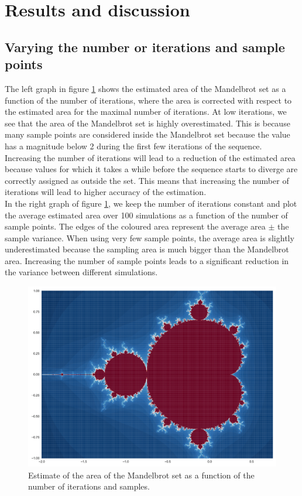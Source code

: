 \documentclass{uva-inf-article}
\begin{document}
\section{Results and discussion}
\subsection{Varying the number or iterations and sample points}

The left graph in figure \ref{fig:var_i_s} shows the estimated area of the Mandelbrot set as a function of the number of iterations, where the area is corrected with respect to the estimated area for the maximal number of iterations.
At low iterations, we see that the area of the Mandelbrot set is highly overestimated.
This is because many sample points are considered inside the Mandelbrot set because the value has a magnitude below 2 during the first few iterations of the sequence.
Increasing the number of iterations will lead to a reduction of the estimated area because values for which it takes a while before the sequence starts to diverge are correctly assigned as outside the set. 
This means that increasing the number of iterations will lead to higher accuracy of the estimation.\\

In the right graph of figure \ref{fig:var_i_s}, we keep the number of iterations constant and plot the average estimated area over 100 simulations as a function of the number of sample points.
The edges of the coloured area represent the average area $\pm$ the sample variance.
When using very few sample points, the average area is slightly underestimated because the sampling area is much bigger than the Mandelbrot area.
Increasing the number of sample points leads to a significant reduction in the variance between different simulations.

\begin{figure}[h]
    \centering
   \includegraphics[width=.85\textwidth]{graphs/fractal.pdf}
    \caption{Estimate of the area of the Mandelbrot set as a function of the number of iterations and samples.}
    \label{fig:var_i_s}
\end{figure}
\end{document}
